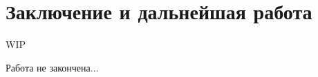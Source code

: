 \section{Заключение и дальнейшая работа}
\label{sec:Chapter11} 

WIP

Работа не закончена...

\newpage
